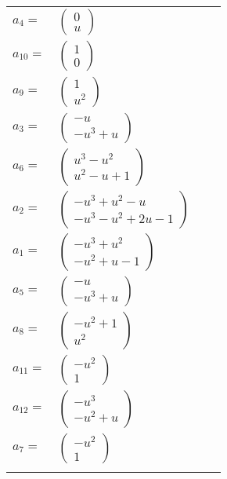 \documentclass[1p]{elsarticle_modified}
\theoremstyle{definition}
\begin{document}
\begin{tabular}{m{7pt} m{180pt} m{7pt} m{180pt} }
\flushright $a_{4}=$&$\begin{pmatrix}0\\u\end{pmatrix}$ \\
\flushright $a_{10}=$&$\begin{pmatrix}1\\0\end{pmatrix}$ \\
\flushright $a_{9}=$&$\begin{pmatrix}1\\u^2\end{pmatrix}$ \\
\flushright $a_{3}=$&$\begin{pmatrix}- u\\- u^3+u\end{pmatrix}$ \\
\flushright $a_{6}=$&$\begin{pmatrix}u^3- u^2\\u^2- u+1\end{pmatrix}$ \\
\flushright $a_{2}=$&$\begin{pmatrix}- u^3+u^2- u\\- u^3- u^2+2 u-1\end{pmatrix}$ \\
\flushright $a_{1}=$&$\begin{pmatrix}- u^3+u^2\\- u^2+u-1\end{pmatrix}$ \\
\flushright $a_{5}=$&$\begin{pmatrix}- u\\- u^3+u\end{pmatrix}$ \\
\flushright $a_{8}=$&$\begin{pmatrix}- u^2+1\\u^2\end{pmatrix}$ \\
\flushright $a_{11}=$&$\begin{pmatrix}- u^2\\1\end{pmatrix}$ \\
\flushright $a_{12}=$&$\begin{pmatrix}- u^3\\- u^2+u\end{pmatrix}$ \\
\flushright $a_{7}=$&$\begin{pmatrix}- u^2\\1\end{pmatrix}$\\&\end{tabular}
\end{document}
